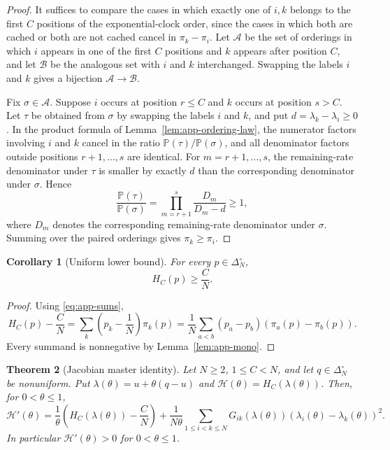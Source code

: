 \documentclass[11pt]{article}
\newtheorem{theorem}{Theorem}[section]
\newtheorem{corollary}[theorem]{Corollary}
\theoremstyle{remark}
\newcommand{\Pp}{\mathbb{P}}
\begin{document}
\begin{proof}
It suffices to compare the cases in which exactly one of $i,k$ belongs to
the first $C$ positions of the exponential-clock order, since the cases in
which both are cached or both are not cached cancel in $\pi_k-\pi_i$.
Let $\mathcal A$ be the set of orderings in which $i$ appears in one of
the first $C$ positions and $k$ appears after position $C$, and let
$\mathcal B$ be the analogous set with $i$ and $k$ interchanged.  Swapping
the labels $i$ and $k$ gives a bijection $\mathcal A\to\mathcal B$.

Fix $\sigma\in\mathcal A$.  Suppose $i$ occurs at position $r\le C$ and
$k$ occurs at position $s>C$.  Let $\tau$ be obtained from $\sigma$ by
swapping the labels $i$ and $k$, and put $d=\lambda_k-\lambda_i\ge0$.
In the product formula of Lemma~\ref{lem:app-ordering-law}, the numerator
factors involving $i$ and $k$ cancel in the ratio
$\Pp(\tau)/\Pp(\sigma)$, and all denominator factors outside positions
$r+1,\ldots,s$ are identical.  For $m=r+1,\ldots,s$, the remaining-rate
denominator under $\tau$ is smaller by exactly $d$ than the corresponding
denominator under $\sigma$.  Hence
\[
        \frac{\Pp(\tau)}{\Pp(\sigma)}
        =
        \prod_{m=r+1}^{s}\frac{D_m}{D_m-d}\ge1,
\]
where $D_m$ denotes the corresponding remaining-rate denominator under
$\sigma$.  Summing over the paired orderings gives
$\pi_k\ge\pi_i$.
\end{proof}

\begin{corollary}[Uniform lower bound]\label{cor:app-uniform-lower}
For every $p\in\Delta_N^\circ$,
\[
        H_C(p)\ge\frac{C}{N}.
\]
\end{corollary}

\begin{proof}
Using \eqref{eq:app-sums},
\[
        H_C(p)-\frac{C}{N}
        =
        \sum_k\left(p_k-\frac1N\right)\pi_k(p)
        =
        \frac1N\sum_{a<b}(p_a-p_b)(\pi_a(p)-\pi_b(p)).
\]
Every summand is nonnegative by Lemma~\ref{lem:app-mono}.
\end{proof}

\begin{theorem}[Jacobian master identity]\label{thm:app-master}
Let $N\ge2$, $1\le C<N$, and let $q\in\Delta_N^\circ$ be nonuniform.  Put
$\lambda(\theta)=u+\theta(q-u)$ and
$\mathcal H(\theta)=H_C(\lambda(\theta))$.  Then, for $0<\theta\le1$,
\begin{equation}\label{eq:app-master}
        \mathcal H'(\theta)
        =
        \frac{1}{\theta}\left(H_C(\lambda(\theta))-\frac{C}{N}\right)
        +
        \frac{1}{N\theta}
        \sum_{1\le i<k\le N}
        G_{ik}(\lambda(\theta))
        (\lambda_i(\theta)-\lambda_k(\theta))^2.
\end{equation}
In particular $\mathcal H'(\theta)>0$ for $0<\theta\le1$.
\end{theorem}
\end{document}
